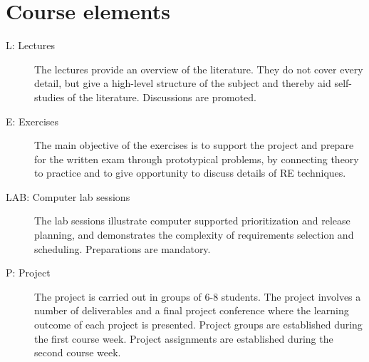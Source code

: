\documentclass[10pt,a4paper]{article}
\begin{document}
\newpage

\section{Course elements}
\begin{description}
\item[L: Lectures] The lectures provide an overview of the literature. They do not cover every detail, but give a high-level structure of the subject and thereby aid self-studies of the literature. Discussions are promoted.
\item[E: Exercises] The main objective of the exercises is to support the project and prepare for the written exam through prototypical problems, by connecting theory to practice and to give opportunity to discuss details of RE techniques.
\item[LAB: Computer lab sessions] The lab sessions illustrate computer supported
prioritization and release planning, and demonstrates the complexity of requirements selection and scheduling. Preparations are mandatory. 
\item[P: Project] The project is carried out in groups of 6-8 students. The project involves a number of deliverables and a final project conference where the learning outcome of each project is presented. Project groups are established during the first course week. Project assignments are established during the second course week.
\end{description}
\end{document}
